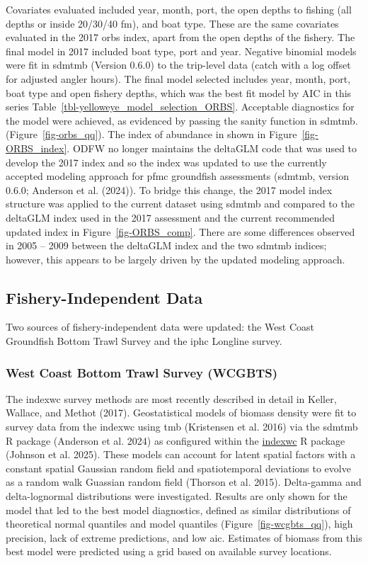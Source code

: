 \documentclass[
]{scrartcl}
\begin{document}
Covariates evaluated included year, month, port, the open depths to
fishing (all depths or inside 20/30/40 fm), and boat type. These are the
same covariates evaluated in the 2017 \gls{orbs} index, apart from the
open depths of the fishery. The final model in 2017 included boat type,
port and year. Negative binomial models were fit in \gls{sdmtmb}
(Version 0.6.0) to the trip-level data (catch with a log offset for
adjusted angler hours). The final model selected includes year, month,
port, boat type and open fishery depths, which was the best fit model by
AIC in this series Table~\ref{tbl-yelloweye_model_selection_ORBS}.
Acceptable diagnostics for the model were achieved, as evidenced by
passing the sanity function in \gls{sdmtmb}.(Figure~\ref{fig-orbs_qq}).
The index of abundance in shown in Figure~\ref{fig-ORBS_index}. ODFW no
longer maintains the deltaGLM code that was used to develop the 2017
index and so the index was updated to use the currently accepted
modeling approach for \gls{pfmc} groundfish assessments (\gls{sdmtmb},
version 0.6.0; Anderson et al. (2024)). To bridge this change, the 2017
model index structure was applied to the current dataset using
\gls{sdmtmb} and compared to the deltaGLM index used in the 2017
assessment and the current recommended updated index in
Figure~\ref{fig-ORBS_comp}. There are some differences observed in 2005
-- 2009 between the deltaGLM index and the two \gls{sdmtmb} indices;
however, this appears to be largely driven by the updated modeling
approach.

\subsection{Fishery-Independent Data}\label{fishery-independent-data}

Two sources of fishery-independent data were updated: the West Coast
Groundfish Bottom Trawl Survey and the \gls{iphc} Longline survey.

\subsubsection{West Coast Bottom Trawl Survey
(WCGBTS)}\label{west-coast-bottom-trawl-survey-wcgbts}

The \gls{indexwc} survey methods are most recently described in detail
in Keller, Wallace, and Methot (2017). Geostatistical models of biomass
density were fit to survey data from the \gls{indexwc} using \gls{tmb}
(Kristensen et al. 2016) via the \gls{sdmtmb} R package (Anderson et al.
2024) as configured within the
\href{https://github.com/pfmc-assessments/indexwc}{indexwc} R package
(Johnson et al. 2025). These models can account for latent spatial
factors with a constant spatial Gaussian random field and spatiotemporal
deviations to evolve as a random walk Guassian random field (Thorson et
al. 2015). Delta-gamma and delta-lognormal distributions were
investigated. Results are only shown for the model that led to the best
model diagnostics, defined as similar distributions of theoretical
normal quantiles and model quantiles (Figure~\ref{fig-wcgbts_qq}), high
precision, lack of extreme predictions, and low \gls{aic}. Estimates of
biomass from this best model were predicted using a grid based on
available survey locations.
\end{document}
